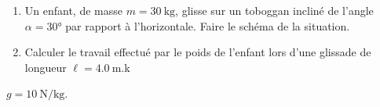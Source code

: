 \begin{enumerate}
    \item Un enfant, de masse $m=\qty{30}{\kg}$, glisse sur un toboggan incliné
          de l'angle $\alpha=\ang{30}$ par rapport à l'horizontale. Faire le
          schéma de la situation.
\item Calculer le travail effectué par le poids de l'enfant lors d'une glissade
      de longueur $\ell=\qty{4.0}{\m}$.k
\end{enumerate}
\begin{donnees}
    $g=\qty{10}{\N\per\kg}$.
\end{donnees}

